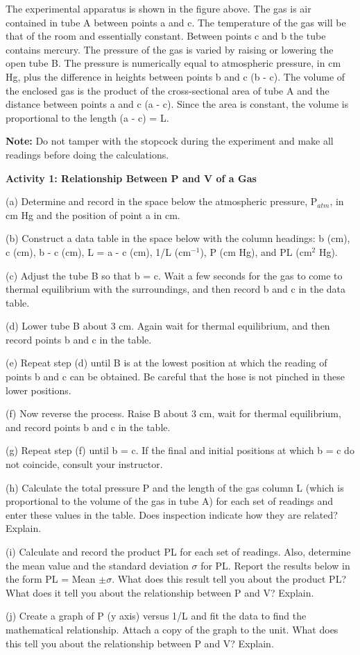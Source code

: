 The experimental apparatus is shown in the figure above. The gas is
air contained in tube A between points a and c. The temperature of
the gas will be that of the room and essentially constant. Between
points c and b the tube contains mercury. The pressure of the gas
is varied by raising or lowering the open tube B. The pressure is
numerically equal to atmospheric pressure, in cm Hg, plus the difference
in heights between points b and c (b - c). The volume of the enclosed
gas is the product of the cross-sectional area of tube A and the distance
between points a and c (a - c). Since the area is constant, the volume
is proportional to the length (a - c) = L.

\textbf{Note:} Do not tamper with the stopcock during the experiment
and make all readings before doing the calculations.

\textbf{Activity 1: Relationship Between P and V of a Gas}

(a) Determine and record in the space below the atmospheric pressure,
P\( _{atm} \), in cm Hg and the position of point a in cm.
\vspace{20mm}

(b) Construct a data table in the space below with the column headings:
b (cm), c (cm), b - c (cm), L = a - c (cm), 1/L (cm\( ^{-1} \)),
P (cm Hg), and PL (cm\( ^{2} \) Hg).
\vspace{120mm}

(c) Adjust the tube B so that b = c. Wait a few seconds for the gas
to come to thermal equilibrium with the surroundings, and then record
b and c in the data table.

(d) Lower tube B about 3 cm. Again wait for thermal equilibrium, and
then record points b and c in the table.

(e) Repeat step (d) until B is at the lowest position at which the
reading of points b and c can be obtained. Be careful that the hose
is not pinched in these lower positions.

(f) Now reverse the process. Raise B about 3 cm, wait for thermal
equilibrium, and record points b and c in the table.

(g) Repeat step (f) until b = c. If the final and initial positions
at which b = c do not coincide, consult your instructor.

(h) Calculate the total pressure P and the length of the gas column
L (which is proportional to the volume of the gas in tube A) for each
set of readings and enter these values in the table. Does inspection
indicate how they are related? Explain.
\vspace{20mm}

(i) Calculate and record the product PL for each set of readings.
Also, determine the mean value and the standard deviation \( \sigma  \)
for PL. Report the results below in the form PL = Mean \( \pm \sigma  \).
What does this result tell you about the product PL? What does it
tell you about the relationship between P and V? Explain.
\vspace{20mm}

(j) Create a graph of P (y axis) versus 1/L and fit the data to find
the mathematical relationship. Attach a copy of the graph to the unit.
What does this tell you about the relationship between P and V? Explain.
